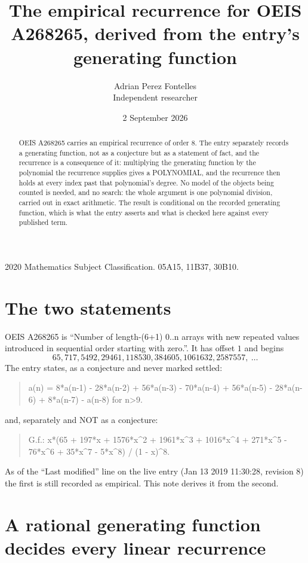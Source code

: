 \documentclass[11pt,a4paper]{article}
\title{The empirical recurrence for OEIS A268265, derived from the entry's generating function}
\author{Adrian Perez Fontelles\\ \small Independent researcher}
\date{2 September 2026}
\theoremstyle{plain}
\theoremstyle{definition}
\begin{document}
\maketitle

\begin{abstract}
OEIS A268265 carries an empirical recurrence of order $8$. The entry separately records a
generating function, not as a conjecture but as a statement of fact, and the recurrence is a
consequence of it: multiplying the generating function by the polynomial the recurrence
supplies gives a POLYNOMIAL, and the recurrence then holds at every index past that
polynomial's degree. No model of the objects being counted is needed, and no search: the
whole argument is one polynomial division, carried out in exact arithmetic. The result is
conditional on the recorded generating function, which is what the entry asserts and what is
checked here against every published term.
\end{abstract}

\noindent\small 2020 Mathematics Subject Classification. 05A15, 11B37, 30B10.\normalsize

\section{The two statements}

OEIS A268265 is ``Number of length-(6+1) 0..n arrays with new repeated values introduced in sequential order starting with zero.''. It has offset $1$ and begins
\[
65, 717, 5492, 29461, 118530, 384605, 1061632, 2587557,\ \dots
\]
The entry states, as a conjecture and never marked settled:
\begin{quote}
a(n) = 8*a(n-1) - 28*a(n-2) + 56*a(n-3) - 70*a(n-4) + 56*a(n-5) - 28*a(n-6) + 8*a(n-7) - a(n-8) for n>9.
\end{quote}
and, separately and NOT as a conjecture:
\begin{quote}
G.f.: x*(65 + 197*x + 1576*x\^{}2 + 1961*x\^{}3 + 1016*x\^{}4 + 271*x\^{}5 - 76*x\^{}6 + 35*x\^{}7 - 5*x\^{}8) / (1 - x)\^{}8.
\end{quote}
As of the ``Last modified'' line on the live entry (Jan 13 2019 11:30:28, revision 8) the first is still
recorded as empirical. This note derives it from the second.

\section{A rational generating function decides every linear recurrence}
\end{document}
